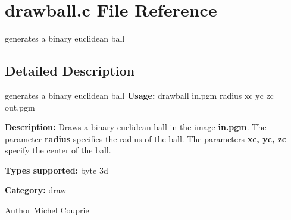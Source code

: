 \section{drawball.c File Reference}
\label{drawball_8c}


generates a binary euclidean ball  




\subsection{Detailed Description}
generates a binary euclidean ball {\bfseries Usage:} drawball in.pgm radius xc yc zc out.pgm

{\bfseries Description:} Draws a binary euclidean ball in the image {\bfseries in.pgm}. The parameter {\bfseries radius} specifies the radius of the ball. The parameters {\bfseries xc, yc, zc} specify the center of the ball.

{\bfseries Types supported:} byte 3d

{\bfseries Category:} draw

\begin{DoxyAuthor}{Author}
Michel Couprie 
\end{DoxyAuthor}
